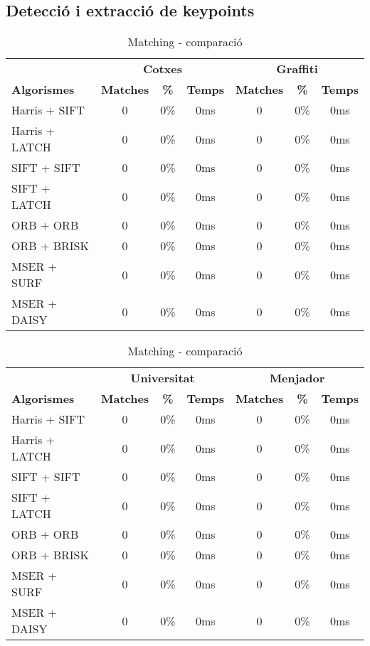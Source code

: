 	\subsection{Detecció i extracció de keypoints}
		\begin{table}[H]
			\begin{center}
				\begin{tabular}{l | c c c | c c c}
					& \multicolumn{3}{c|}{\textbf{Cotxes}} & \multicolumn{3}{c}{\textbf{Graffiti}} \\
					\textbf{Algorismes} & \textbf{Matches} & \textbf{\%} & \textbf{Temps} & \textbf{Matches} & \textbf{\%} & \textbf{Temps} \\ \hline
					Harris + SIFT & 0 & 0\% & 0ms & 0 & 0\% & 0ms \\
					Harris + LATCH & 0 & 0\% & 0ms & 0 & 0\% & 0ms \\
					SIFT + SIFT & 0 & 0\% & 0ms & 0 & 0\% & 0ms \\
					SIFT + LATCH & 0 & 0\% & 0ms & 0 & 0\% & 0ms \\
					ORB + ORB & 0 & 0\% & 0ms & 0 & 0\% & 0ms \\
					ORB + BRISK & 0 & 0\% & 0ms & 0 & 0\% & 0ms \\
					MSER + SURF & 0 & 0\% & 0ms & 0 & 0\% & 0ms \\
					MSER + DAISY & 0 & 0\% & 0ms & 0 & 0\% & 0ms \\
				\end{tabular}
			\end{center}
			\caption{Matching - comparació}
		\end{table}

		\begin{table}[H]
			\begin{center}
				\begin{tabular}{l | c c c | c c c}
					& \multicolumn{3}{c|}{\textbf{Universitat}} & \multicolumn{3}{c}{\textbf{Menjador}} \\
					\textbf{Algorismes} & \textbf{Matches} & \textbf{\%} & \textbf{Temps} & \textbf{Matches} & \textbf{\%} & \textbf{Temps} \\ \hline
					Harris + SIFT & 0 & 0\% & 0ms & 0 & 0\% & 0ms \\
					Harris + LATCH & 0 & 0\% & 0ms & 0 & 0\% & 0ms \\
					SIFT + SIFT & 0 & 0\% & 0ms & 0 & 0\% & 0ms \\
					SIFT + LATCH & 0 & 0\% & 0ms & 0 & 0\% & 0ms \\
					ORB + ORB & 0 & 0\% & 0ms & 0 & 0\% & 0ms \\
					ORB + BRISK & 0 & 0\% & 0ms & 0 & 0\% & 0ms \\
					MSER + SURF & 0 & 0\% & 0ms & 0 & 0\% & 0ms \\
					MSER + DAISY & 0 & 0\% & 0ms & 0 & 0\% & 0ms \\
				\end{tabular}
			\end{center}
			\caption{Matching - comparació}
		\end{table}
